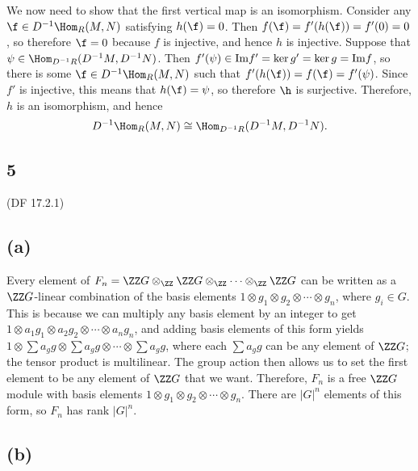 \documentclass[12pt, reqno]{amsart}
\begin{document}
We now need to show that the first vertical map is an isomorphism. Consider any
$\f \in D^{-1}\Hom_R (M, N)$ satisfying $h(\f)= 0$. Then $f(\f) = f'(h(\f)) =
f'(0) = 0$, so therefore $\f = 0$ because $f$ is injective, and hence $h$ is
injective. 
%
Suppose that $\psi \in \Hom_{D^{-1}R}(D^{-1}M, D^{-1}N)$.
Then $f'(\psi) \in \mathrm{Im} f' = \ker g' = \ker g = \mathrm{Im} f$, so there is some $\f \in
D^{-1} \Hom_R(M, N)$ such that $f'(h(\f)) = f(\f) = f'(\psi)$. Since $f'$ is
injective, this means that $h(\f) = \psi$, so therefore $\h$ is surjective.
Therefore, $h$ is an isomorphism, and hence
\[ 
D^{-1}\Hom_R(M, N) \cong \Hom_{D^{-1}R}(D^{-1}M, D^{-1}N).
\] 

\subsection*{5} (DF 17.2.1)

\subsection*{(a)}

Every element of 
$F_n = \ZZ G \otimes_\ZZ \ZZ G \otimes_\ZZ \cdots \otimes_\ZZ \ZZ G$ can be
written as a $\ZZ G$-linear combination of the basis elements
$1 \otimes g_1 \otimes g_2 \otimes \cdots \otimes g_n$, where $g_i \in G$. This
is because we can multiply any basis element by an integer to get
$1 \otimes a_1 g_1 \otimes a_2 g_2 \otimes \cdots \otimes a_n g_n$, and adding
basis elements of this form yields $1 \otimes \sum a_g g \otimes \sum a_g g
\otimes \cdots
\otimes \sum a_g g$, where each $\sum a_g g$ can be any element of $\ZZ G$; the tensor product is
multilinear. The group action then allows us to set the first element to be any
element of $\ZZ G$ that we want. Therefore, $F_n$ is a free $\ZZ G$ module with
basis elements $1 \otimes g_1 \otimes g_2 \otimes \cdots \otimes g_n$. There
are $|G|^n$ elements of this form, so $F_n$ has rank $|G|^n$.

\subsection*{(b)}
\end{document}
